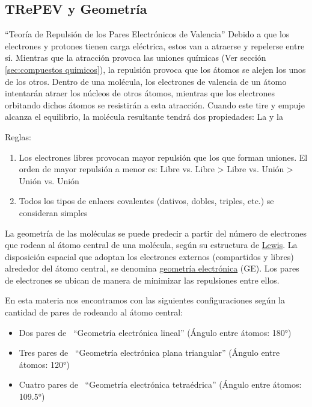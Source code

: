 \documentclass[../Teoría.root.tex]{subfiles}
\begin{document}
\subsection{TRePEV y Geometría}
\label{sec:trepev}
“Teoría de Repulsión de los Pares Electrónicos de Valencia”
Debido a que los electrones y protones tienen carga eléctrica, estos van a atraerse y repelerse entre sí. Mientras que la atracción provoca las uniones químicas (Ver sección \ref{sec:compuestos quimicos}), la repulsión provoca que los átomos se alejen los unos de los otros. Dentro de una molécula, los electrones de valencia de un átomo intentarán atraer los núcleos de otros átomos, mientras que los electrones orbitando dichos átomos se resistirán a esta atracción. Cuando este tire y empuje alcanza el equilibrio, la molécula resultante tendrá dos propiedades: La  y la 

Reglas:
\label{lst:representaciones.reglas}
\begin{enumerate}
    \item Los electrones libres provocan mayor repulsión que los que forman uniones. El orden de mayor repulsión a menor es: Libre vs. Libre > Libre vs. Unión > Unión vs. Unión
    \item Todos los tipos de enlaces covalentes (dativos, dobles, triples, etc.) se consideran simples
\end{enumerate}

La geometría de las moléculas se puede predecir a partir del número de electrones que rodean al átomo central de una molécula, según su estructura de \hyperref[sec:lewis]{Lewis}. La disposición espacial que adoptan los electrones externos (compartidos y libres) alrededor del átomo central, se denomina \underline{geometría electrónica} (GE). Los pares de electrones se ubican de manera de minimizar las repulsiones entre ellos.

En esta materia nos encontramos con las siguientes configuraciones según la cantidad de pares de  rodeando al átomo central:
\begin{itemize}
    \item Dos pares de  \rightarrow\ “Geometría electrónica lineal” (Ángulo entre átomos: \ang{180})

    \item Tres pares de  \rightarrow\ “Geometría electrónica plana triangular” (Ángulo entre átomos: \ang{120})

    \item Cuatro pares de  \rightarrow\ “Geometría electrónica tetraédrica” (Ángulo entre átomos: \ang{109.5})

\end{itemize}
\end{document}
